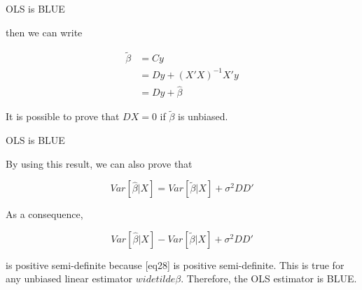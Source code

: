 \documentclass[australian,ignorenonframetext,aspectratio=169]{beamer}
\begin{document}
\begin{frame}{OLS is BLUE}
\protect\hypertarget{ols-is-blue-1}{}

then we can write

\[\begin{aligned}\widetilde{\beta} &= Cy\\
                    &= Dy + (X'X)^{-1}X'y\\
                    &= Dy + \widehat{\beta}
                    \end{aligned}\]

It is possible to prove that \(DX=0\) if \(\widetilde{\beta }\) is
unbiased.

\end{frame}

\begin{frame}{OLS is BLUE}
\protect\hypertarget{ols-is-blue-2}{}

By using this result, we can also prove that

\[Var[\widehat{\beta}|X] = Var[\widetilde{\beta}|X] + \sigma^2DD'\]

As a consequence,

\[Var[\widehat{\beta}|X] - Var[\widetilde{\beta}|X] + \sigma^2DD'\]

is positive semi-definite because {[}eq28{]} is positive semi-definite.
This is true for any unbiased linear estimator \(widetilde{\beta }\).
Therefore, the OLS estimator is BLUE.

\end{frame}
\end{document}
